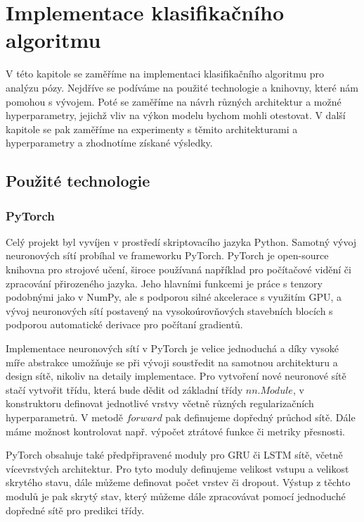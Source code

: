 \chapter{Implementace klasifikačního algoritmu}
\label{chap:ClassificationImplementation}

V této kapitole se zaměříme na implementaci klasifikačního algoritmu pro
analýzu pózy. Nejdříve se podíváme na použité technologie a knihovny, které nám
pomohou s vývojem. Poté se zaměříme na návrh různých architektur a možné
hyperparametry, jejichž vliv na výkon modelu bychom mohli otestovat. V další
kapitole se pak zaměříme na experimenty s těmito architekturami a
hyperparametry a zhodnotíme získané výsledky.

\section{Použité technologie}

\subsection{PyTorch}

Celý projekt byl vyvíjen v prostředí skriptovacího jazyka Python. Samotný vývoj
neuronových sítí probíhal ve frameworku PyTorch. PyTorch je open-source
knihovna pro strojové učení, široce používaná například pro počítačové vidění
či zpracování přirozeného jazyka. Jeho hlavními funkcemi je práce s tenzory
podobnými jako v NumPy, ale s podporou silné akcelerace s využitím GPU, a vývoj
neuronových sítí postavený na vysokoúrovňových stavebních blocích s podporou
automatické derivace pro počítaní gradientů.

Implementace neuronových sítí v PyTorch je velice jednoduchá a díky vysoké míře  
abstrakce umožňuje se při vývoji soustředit na samotnou architekturu a design
sítě, nikoliv na detaily implementace. Pro vytvoření nové neuronové sítě stačí
vytvořit třídu, která bude dědit od základní třídy $nn.Module$, v konstruktoru
definovat jednotlivé vrstvy včetně různých regularizačních hyperparametrů. V
metodě $forward$ pak definujeme dopředný průchod sítě. Dále máme možnost
kontrolovat např. výpočet ztrátové funkce či metriky přesnosti.

PyTorch obsahuje také předpřipravené moduly pro GRU či LSTM sítě, včetně
vícevrstvých architektur. Pro tyto moduly definujeme velikost vstupu a
velikost skrytého stavu, dále můžeme definovat počet vrstev či dropout. Výstup
z těchto modulů je pak skrytý stav, který můžeme dále zpracovávat pomocí
jednoduché dopředné sítě pro predikci třídy.

